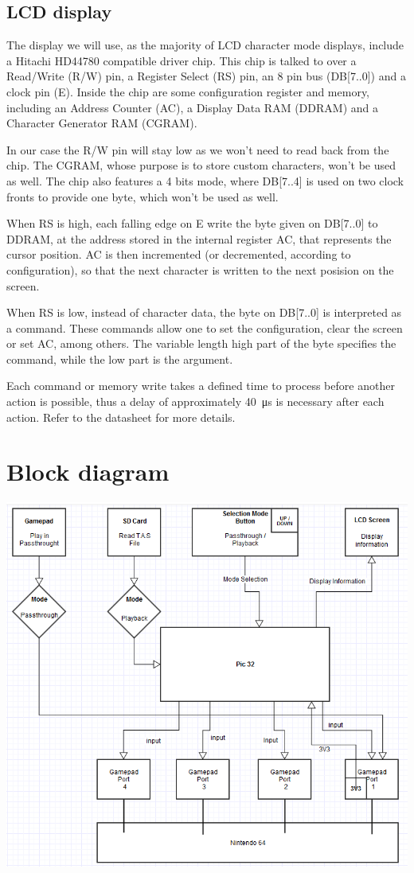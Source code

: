 \documentclass[a4paper,oneside,12pt]{article}
\begin{document}
\subsection{LCD display}
The display we will use, as the majority of LCD character mode displays, include
a Hitachi HD44780 compatible driver chip. This chip is talked to over a
Read/Write (R/W) pin, a Register Select (RS) pin, an 8 pin bus (DB[7..0]) and a
clock pin (E). Inside the chip are some configuration register and memory,
including an Address Counter (AC), a Display Data RAM (DDRAM) and a Character
Generator RAM (CGRAM).

In our case the R/W pin will stay low as we won't need to read back from the
chip. The CGRAM, whose purpose is to store custom characters, won't be used as
well. The chip also features a 4 bits mode, where DB[7..4] is used on two clock
fronts to provide one byte, which won't be used as well.

When RS is high, each falling edge on E write the byte given on DB[7..0] to
DDRAM, at the address stored in the internal register AC, that represents the
cursor position. AC is then incremented (or decremented, according to
configuration), so that the next character is written to the next posision on
the screen.

When RS is low, instead of character data, the byte on DB[7..0] is interpreted
as a command. These commands allow one to set the configuration, clear the
screen or set AC, among others. The variable length high part of the byte
specifies the command, while the low part is the argument.

Each command or memory write takes a defined time to process before another
action is possible, thus a delay of approximately \SI{40}{\us} is necessary
after each action. Refer to the datasheet for more details.

\section{Block diagram}
\includegraphics[width=\textwidth]{Diagramme.png}
\end{document}
